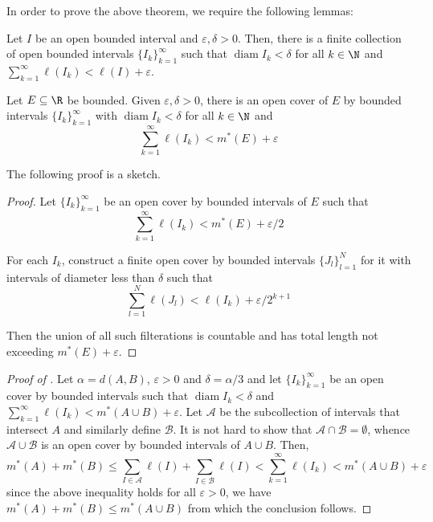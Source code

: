 In order to prove the above theorem, we require the following lemmas: 

\begin{lemma}
    Let $I$ be an open bounded interval and $\varepsilon, \delta > 0$. Then, there is a finite collection of open bounded intervals $\{I_k\}_{k = 1}^\infty$ such that $\operatorname{diam} I_k < \delta$ for all $k\in\N$ and $\sum_{k = 1}^\infty\ell(I_k) < \ell(I) + \varepsilon$.
\end{lemma}

\begin{lemma}
    Let $E\subseteq\R$ be bounded. Given $\varepsilon, \delta > 0$, there is an open cover of $E$ by bounded intervals $\{I_k\}_{k = 1}^\infty$ with $\operatorname{diam} I_k < \delta$ for all $k\in\N$ and 
    \begin{equation*}
        \sum_{k = 1}^\infty \ell(I_k) < m^*(E) + \varepsilon
    \end{equation*}
\end{lemma}
The following proof is a sketch.
\begin{proof}
    Let $\{I_k\}_{k = 1}^\infty$ be an open cover by bounded intervals of $E$ such that 
    \begin{equation*}
        \sum_{k = 1}^\infty \ell(I_k) < m^*(E) + \varepsilon/2
    \end{equation*}

    For each $I_k$, construct a finite open cover by bounded intervals $\{J_l\}_{l = 1}^N$ for it with intervals of diameter less than $\delta$ such that 
    \begin{equation*}
        \sum_{l = 1}^N\ell(J_l) < \ell(I_k) + \varepsilon/2^{k + 1}
    \end{equation*}

    Then the union of all such filterations is countable and has total length not exceeding $m^*(E) + \varepsilon$.
\end{proof}

\begin{proof}[Proof of ]
    Let $\alpha = d(A,B)$, $\varepsilon > 0$ and $\delta = \alpha/3$ and let $\{I_k\}_{k = 1}^\infty$ be an open cover by bounded intervals such that $\operatorname{diam} I_k < \delta$ and $\sum_{k = 1}^\infty\ell(I_k) < m^*(A\cup B) + \varepsilon$. Let $\mathscr A$ be the subcollection of intervals that intersect $A$ and similarly define $\mathscr B$. It is not hard to show that $\mathscr A\cap\mathscr B = \emptyset$, whence $\mathscr A\cup\mathscr B$ is an open cover by bounded intervals of $A\cup B$. Then, 
    \begin{equation*}
        m^*(A) + m^*(B)\le\sum_{I\in\mathscr A}\ell(I) + \sum_{I\in\mathscr B}\ell(I) < \sum_{k = 1}^\infty\ell(I_k) < m^*(A\cup B) + \varepsilon
    \end{equation*}
    since the above inequality holds for all $\varepsilon > 0$, we have $m^*(A) + m^*(B)\le m^*(A\cup B)$ from which the conclusion follows.
\end{proof}

